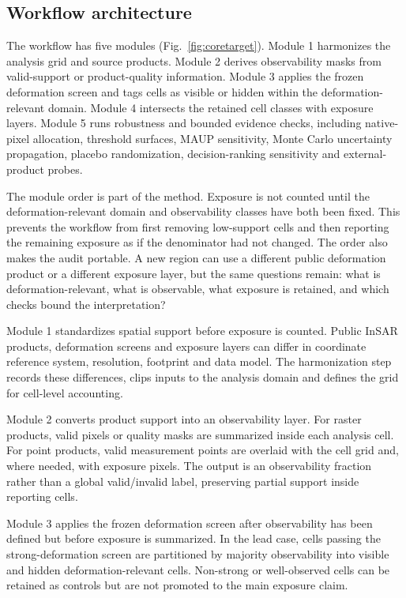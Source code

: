 \documentclass[pdflatex,sn-mathphys-ay]{sn-jnl}
\begin{document}
\subsection{Workflow architecture}

The workflow has five modules (Fig.~\ref{fig:coretarget}). Module 1 harmonizes the analysis grid and source products. Module 2 derives observability masks from valid-support or product-quality information. Module 3 applies the frozen deformation screen and tags cells as visible or hidden within the deformation-relevant domain. Module 4 intersects the retained cell classes with exposure layers. Module 5 runs robustness and bounded evidence checks, including native-pixel allocation, threshold surfaces, MAUP sensitivity, Monte Carlo uncertainty propagation, placebo randomization, decision-ranking sensitivity and external-product probes.

The module order is part of the method. Exposure is not counted until the deformation-relevant domain and observability classes have both been fixed. This prevents the workflow from first removing low-support cells and then reporting the remaining exposure as if the denominator had not changed. The order also makes the audit portable. A new region can use a different public deformation product or a different exposure layer, but the same questions remain: what is deformation-relevant, what is observable, what exposure is retained, and which checks bound the interpretation?

Module 1 standardizes spatial support before exposure is counted. Public InSAR products, deformation screens and exposure layers can differ in coordinate reference system, resolution, footprint and data model. The harmonization step records these differences, clips inputs to the analysis domain and defines the grid for cell-level accounting.

Module 2 converts product support into an observability layer. For raster products, valid pixels or quality masks are summarized inside each analysis cell. For point products, valid measurement points are overlaid with the cell grid and, where needed, with exposure pixels. The output is an observability fraction rather than a global valid/invalid label, preserving partial support inside reporting cells.

Module 3 applies the frozen deformation screen after observability has been defined but before exposure is summarized. In the lead case, cells passing the strong-deformation screen are partitioned by majority observability into visible and hidden deformation-relevant cells. Non-strong or well-observed cells can be retained as controls but are not promoted to the main exposure claim.
\end{document}
